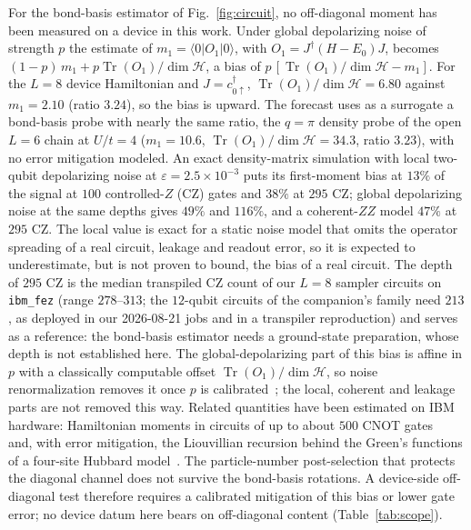 \documentclass[submission, PhysCore]{SciPost}
\begin{document}
\begin{appendix}
For the bond-basis estimator of Fig.~\ref{fig:circuit}, no off-diagonal moment has been measured on a device in this work. Under global depolarizing noise of strength $p$ the estimate of $m_1=\langle 0|O_1|0\rangle$, with $O_1=J^\dagger(H-E_0)J$, becomes $(1-p)\,m_1+p\operatorname{Tr}(O_1)/\dim\mathcal H$, a bias of $p\,[\operatorname{Tr}(O_1)/\dim\mathcal H-m_1]$. For the $L=8$ device Hamiltonian and $J=c^{\dagger}_{0\uparrow}$, $\operatorname{Tr}(O_1)/\dim\mathcal H=6.80$ against $m_1=2.10$ (ratio $3.24$), so the bias is upward. The forecast uses as a surrogate a bond-basis probe with nearly the same ratio, the $q=\pi$ density probe of the open $L=6$ chain at $U/t=4$ ($m_1=10.6$, $\operatorname{Tr}(O_1)/\dim\mathcal H=34.3$, ratio $3.23$), with no error mitigation modeled. An exact density-matrix simulation with local two-qubit depolarizing noise at $\varepsilon=2.5\times10^{-3}$ puts its first-moment bias at $13\%$ of the signal at $100$ controlled-$Z$ (CZ) gates and $38\%$ at $295$ CZ; global depolarizing noise at the same depths gives $49\%$ and $116\%$, and a coherent-$ZZ$ model $47\%$ at $295$ CZ. The local value is exact for a static noise model that omits the operator spreading of a real circuit, leakage and readout error, so it is expected to underestimate, but is not proven to bound, the bias of a real circuit. The depth of $295$ CZ is the median transpiled CZ count of our $L=8$ sampler circuits on \texttt{ibm\_fez} (range $278$--$313$; the $12$-qubit circuits of the companion's family need $213$, as deployed in our 2026-08-21 jobs and in a transpiler reproduction) and serves as a reference: the bond-basis estimator needs a ground-state preparation, whose depth is not established here. The global-depolarizing part of this bias is affine in $p$ with a classically computable offset $\operatorname{Tr}(O_1)/\dim\mathcal H$, so noise renormalization removes it once $p$ is calibrated~\cite{Vovrosh2021,Kiss2025}; the local, coherent and leakage parts are not removed this way. Related quantities have been estimated on IBM hardware: Hamiltonian moments in circuits of up to about $500$ CNOT gates~\cite{Vallury2023} and, with error mitigation, the Liouvillian recursion behind the Green's functions of a four-site Hubbard model~\cite{Leblanc2026}. The particle-number post-selection that protects the diagonal channel does not survive the bond-basis rotations. A device-side off-diagonal test therefore requires a calibrated mitigation of this bias or lower gate error; no device datum here bears on off-diagonal content (Table~\ref{tab:scope}).


\end{appendix}
\end{document}
